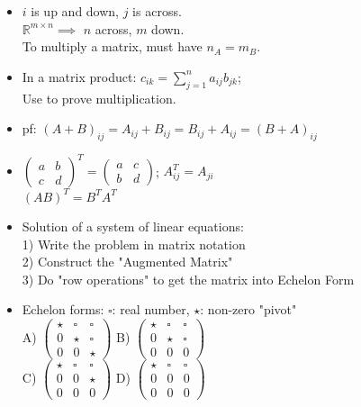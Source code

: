 \documentclass[10pt]{article}
\begin{document}
\begin{multicols}{2}
\begin{itemize}
    \item $i$ is up and down, $j$ is across.\\
    $\mathbb{R}^{m\times n}\implies$ $n$ across, $m$ down.\\
    To multiply a matrix, must have $n_{A}=m_{B}$.
    \item In a matrix product: $c_{ik}=\sum^{n}_{j=1}a_{ij}b_{jk}$; \\Use to prove multiplication.
    \item pf: $(A+B)_{ij}=A_{ij}+B_{ij}=B_{ij}+A_{ij}=(B+A)_{ij}$
    \item$\begin{pmatrix}a &b\\c &d\end{pmatrix}^{T}=\begin{pmatrix}a &c\\b& d\end{pmatrix}$; $A^{T}_{ij}=A_{ji}$\\
    $(AB)^{T}=B^{T}A^{T}$
    \item Solution of a system of linear equations:\\
    1) Write the problem in matrix notation\\
    2) Construct the "Augmented Matrix"\\
    3) Do "row operations" to get the matrix into Echelon Form
    \item Echelon forms: $\square$: real number, $\star$: non-zero "pivot"\\
    A) $\begin{pmatrix}\star &\square &\square\\ 0 &\star &\square\\0 &0 &\star\end{pmatrix}$
    B) $\begin{pmatrix}\star &\square &\square\\ 0 &\star &\square\\0 &0 &0\end{pmatrix}$\\
    C) $\begin{pmatrix}\star &\square &\square\\ 0 &0 &\star\\0 &0 &0\end{pmatrix}$
    D) $\begin{pmatrix}\star &\square &\square\\ 0 &0 &0\\0 &0 &0\end{pmatrix}$

\end{itemize}
\end{multicols}
\end{document}
